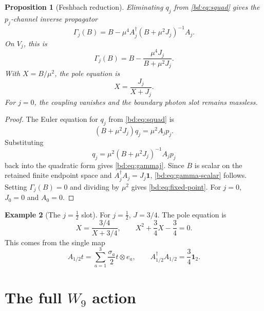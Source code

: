 \documentclass[11pt]{article}
\theoremstyle{plain}
\newtheorem{proposition}{Proposition}[section]
\theoremstyle{definition}
\newtheorem{example}[proposition]{Example}
\begin{document}
\begin{proposition}[Feshbach reduction]
\label{bd:prop:feshbach}
Eliminating \(q_j\) from \eqref{bd:eq:squad} gives the \(p_j\)-channel inverse
propagator
\begin{equation}
  \Gamma_j(B)
  =
  B-\mu^4A_j^\dagger(B+\mu^2J_j)^{-1}A_j .
  \label{bd:eq:gammaj}
\end{equation}
On \(V_j\), this is
\begin{equation}
  \Gamma_j(B)
  =
  B-\frac{\mu^4J_j}{B+\mu^2J_j}.
  \label{bd:eq:gamma-scalar}
\end{equation}
With \(X=B/\mu^2\), the pole equation is
\begin{equation}
  X=\frac{J_j}{X+J_j}.
  \label{bd:eq:fixed-point}
\end{equation}
For \(j=0\), the coupling vanishes and the boundary photon slot remains
massless.
\end{proposition}

\begin{proof}
The Euler equation for \(q_j\) from \eqref{bd:eq:squad} is
\[
  (B+\mu^2J_j)q_j=\mu^2A_jp_j .
\]
Substituting
\[
  q_j=\mu^2(B+\mu^2J_j)^{-1}A_jp_j
\]
back into the quadratic form gives \eqref{bd:eq:gammaj}.  Since \(B\) is scalar on
the retained finite endpoint space and \(A_j^\dagger A_j=J_j\mathbf 1\),
\eqref{bd:eq:gamma-scalar} follows.  Setting \(\Gamma_j(B)=0\) and dividing by
\(\mu^2\) gives \eqref{bd:eq:fixed-point}.  For \(j=0\), \(J_0=0\) and \(A_0=0\).
\end{proof}

\begin{example}[The \(j=\tfrac12\) slot]
\label{bd:ex:jhalf-kernel}
For \(j=\tfrac12\), \(J=3/4\).  The pole equation is
\[
  X=\frac{3/4}{X+3/4},
  \qquad
  X^2+\frac34X-\frac34=0 .
\]
This comes from the single map
\[
  A_{1/2}t=\sum_{a=1}^3\frac{\sigma_a}{2}t\otimes e_a,
  \qquad A_{1/2}^\dagger A_{1/2}=\frac34\mathbf 1_2 .
\]
\end{example}

\section{The full \(W_9\) action}
\label{bd:sec:full-action}
\end{document}

